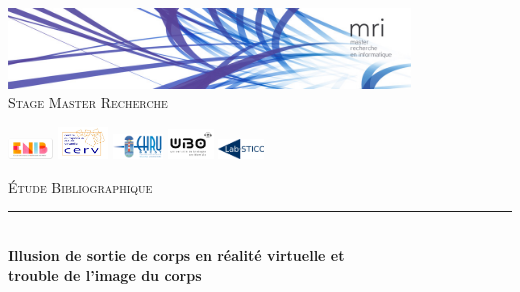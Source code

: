 \documentclass[11pt]{article}
\newcommand{\HRule}{\rule{\linewidth}{0.5mm}}
\begin{document}
\begin{titlepage}

\begin{center}


 

\includegraphics[width=0.8\textwidth]{./header}\\[1cm]
\textsc{\Large Stage Master Recherche}
\vspace{1cm}

\includegraphics[width=0.09\textwidth]{./logo_ENIB}
\includegraphics[width=0.1\textwidth]{./cerv}
\includegraphics[width=0.1\textwidth]{./CHRU-Brest}
\includegraphics[width=0.09\textwidth]{./UBO}
\includegraphics[width=0.09\textwidth]{./logo-labsticc}


  
\vspace{1cm} 
\textsc{\Large \'{E}tude Bibliographique }\\[0.5cm]


\HRule \\[0.4cm]
{ \Large \bfseries Illusion de sortie de corps en réalité virtuelle et\\trouble de l'image du corps }\\[0.4cm]


\end{center}
\end{titlepage}
\end{document}
